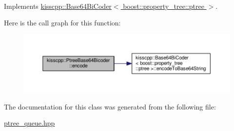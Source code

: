 Implements \hyperlink{a00019_ade4ace8899f97568458a62df0222b32c}{kisscpp\-::\-Base64\-Bi\-Coder$<$ boost\-::property\-\_\-tree\-::ptree $>$}.



Here is the call graph for this function\-:\nopagebreak
\begin{figure}[H]
\begin{center}
\leavevmode
\includegraphics[width=350pt]{a00036_a7f4bbf8b4b4626fa9228118889fd51d2_cgraph}
\end{center}
\end{figure}




The documentation for this class was generated from the following file\-:\begin{DoxyCompactItemize}
\item 
\hyperlink{a00071}{ptree\-\_\-queue.\-hpp}\end{DoxyCompactItemize}

